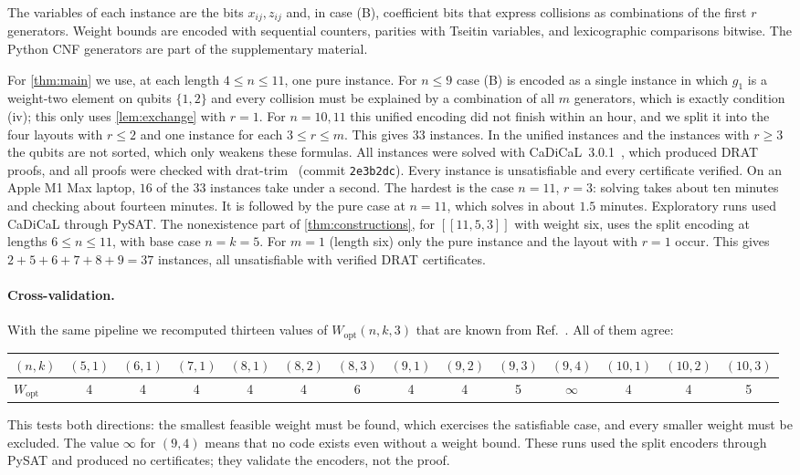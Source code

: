 \documentclass[a4paper,onecolumn,unpublished]{quantumarticle}
\theoremstyle{definition}
\theoremstyle{remark}
\newcommand{\Wopt}{W_{\mathrm{opt}}}
\newcommand{\qc}[1]{[\![#1]\!]}
\begin{document}
The variables of each instance are the bits $x_{ij},z_{ij}$ and, in case (B), coefficient bits
that express collisions as combinations of the first $r$ generators. Weight bounds are encoded
with sequential counters, parities with Tseitin variables, and lexicographic comparisons
bitwise. The Python CNF generators are part of the supplementary material.

For \cref{thm:main} we use, at each length $4\le n\le11$, one pure instance. For $n\le9$ case (B)
is encoded as a single instance in which $g_1$ is a weight-two element on qubits $\{1,2\}$ and
every collision must be explained by a combination of all $m$ generators, which is exactly
condition (iv); this only uses \cref{lem:exchange} with $r=1$. For $n=10,11$ this unified
encoding did not finish within an hour, and we split it into the four layouts with $r\le2$ and one
instance for each $3\le r\le m$. This gives $33$ instances. In the unified instances and the
instances with $r\ge3$ the qubits are not sorted, which only weakens these formulas. All
instances were solved with CaDiCaL~3.0.1~\cite{Cadical2}, which produced DRAT proofs, and all
proofs were checked with drat-trim~\cite{WHH14} (commit \texttt{2e3b2dc}). Every instance is
unsatisfiable and every certificate verified. On an Apple M1 Max laptop, $16$ of the $33$
instances take under a second. The hardest is the case $n=11$, $r=3$: solving takes about ten
minutes and checking about fourteen minutes. It is followed by the pure case at $n=11$, which
solves in about $1.5$ minutes. Exploratory runs used CaDiCaL through PySAT. The nonexistence part of \cref{thm:constructions}, for $\qc{11,5,3}$ with
weight six, uses the split encoding at lengths $6\le n\le11$, with base case $n=k=5$. For $m=1$
(length six) only the pure instance and the layout with $r=1$ occur. This gives
$2+5+6+7+8+9=37$ instances, all unsatisfiable with verified DRAT certificates.

\paragraph{Cross-validation.}
With the same pipeline we recomputed thirteen values of $\Wopt(n,k,3)$ that are known from
Ref.~\cite{WHHLL26}. All of them agree:
\begin{center}
\footnotesize\setlength{\tabcolsep}{3.2pt}
\begin{tabular}{l*{13}{c}}
\toprule
$(n,k)$ & $(5,1)$ & $(6,1)$ & $(7,1)$ & $(8,1)$ & $(8,2)$ & $(8,3)$ & $(9,1)$ & $(9,2)$ & $(9,3)$ & $(9,4)$ & $(10,1)$ & $(10,2)$ & $(10,3)$ \\
\midrule
$\Wopt$ & 4 & 4 & 4 & 4 & 4 & 6 & 4 & 4 & 5 & $\infty$ & 4 & 4 & 5 \\
\bottomrule
\end{tabular}
\end{center}
This tests both directions: the smallest feasible weight must be found, which exercises the
satisfiable case, and every smaller weight must be excluded. The value $\infty$ for $(9,4)$ means
that no code exists even without a weight bound. These runs used the split encoders through
PySAT and produced no certificates; they validate the encoders, not the proof.
\end{document}
